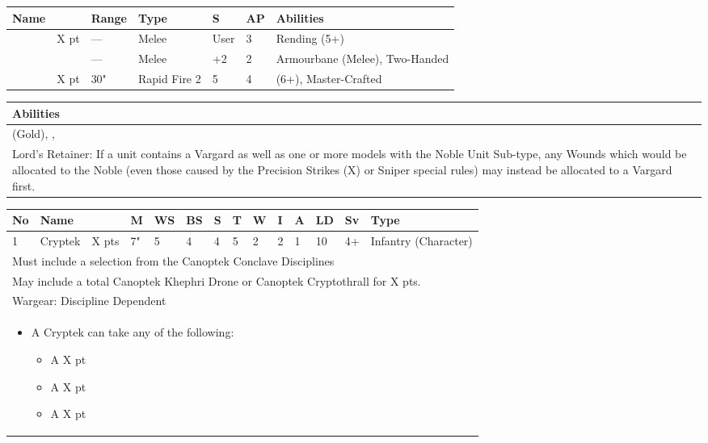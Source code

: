 \noindent
\begin{tabular}{||m{110pt} m{30pt} m{31pt} m{55pt} m{12pt} m{12pt} m{210pt}||}
	\hline
	Name & & Range & Type & S & AP & Abilities \\
	\hline
	\quickref{Hyperphase Sword} & X pt & — & Melee & User & 3 & Rending (5+) \\
	\quickref{Warscythe} & & — & Melee & +2 & 2 & Armourbane (Melee), Two-Handed \\
	\quickref{Relic Gauss Blaster} & X pt & 30" & Rapid Fire 2 & 5 & 4 & \quickref{Gauss} (6+), Master-Crafted \\	
	\hline
\end{tabular}

\noindent
\begin{tabular}{||m{532pt}||}
	\hline
	Abilities \\
	\hline
	\quickref{Awakening Protocols}(Gold), \quickref{Living Metal}, \quickref{Reanimation Protocols} \\
	Lord's Retainer: If a unit contains a Vargard as well as one or more models with the Noble Unit Sub-type, any Wounds which would be allocated to the Noble (even those caused by the Precision Strikes (X) or Sniper special rules) may instead	be allocated to a Vargard first. \\
	\hline
\end{tabular}


\newpage
{}

\noindent
\begin{tabular}{||m{10pt} m{95pt} m{30pt} m{11pt} m{11pt} m{11pt} m{11pt} m{11pt} m{11pt} m{11pt} m{11pt} m{11pt} m{11pt} m{125pt}||}
	\hline
	No & Name & & M & WS & BS & S & T & W & I & A & LD & Sv & Type \\
	\hline
	1 & Cryptek & X pts & 7" & 5 & 4 & 4 & 5 & 2 & 2 & 1 & 10 & 4+ & Infantry (Character)\\
	\hline
	\hline
	\multicolumn{14}{||Z{532 pt}||}{Must include a selection from the Canoptek Conclave Disciplines}\\
	\multicolumn{14}{||Z{532 pt}||}{May include a total Canoptek Khephri Drone or Canoptek Cryptothrall for X pts.}\\	
	\hline
	\hline
	\multicolumn{14}{||Z{532 pt}||}{Wargear: Discipline Dependent} \\		
	\multicolumn{14}{||Z{532 pt}||}{\begin{itemize}
			\item A Cryptek can take any of the following:
			\begin{itemize}
				\item A \quickref{Phase Shifter} \hrulefill X pt
				\item A \quickref{Phylactery} \hrulefill X pt
				\item A \quickref{Sempiternal Weave} \hrulefill X pt
			\end{itemize}
	\end{itemize}} \\	
	\hline
\end{tabular}

